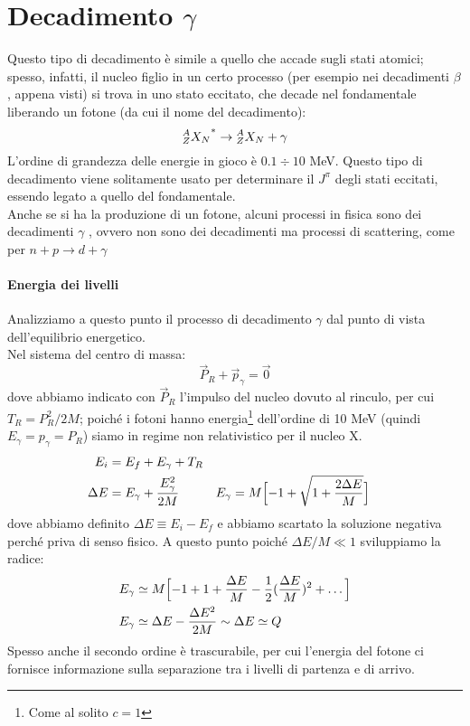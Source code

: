 \section{Decadimento $\gamma$}
Questo tipo di decadimento è simile a quello che accade sugli stati atomici; spesso, infatti, il nucleo figlio in un certo processo (per esempio nei decadimenti $\beta$, appena visti) si trova in uno stato eccitato, che decade nel fondamentale liberando un fotone (da cui il nome del decadimento):
$$\nuc{X}{A}{Z}{N}^* \to \nuc{X}{A}{Z}{N} + \gamma $$
L'ordine di grandezza delle energie in gioco è $0.1 \div 10$ MeV. Questo tipo di decadimento viene solitamente usato per determinare il $J^\pi$ degli stati eccitati, essendo legato a quello del fondamentale.\\
Anche se si ha la produzione di un fotone, alcuni processi in fisica sono dei decadimenti $\gamma$ , ovvero non sono dei decadimenti ma processi di scattering, come per $n+p\to d +\gamma$

\paragraph{Energia dei livelli} Analizziamo a questo punto il processo di decadimento $\gamma$ dal punto di vista dell'equilibrio energetico.\\
Nel sistema del centro di massa:
$$\vec{P}_R + \vec{p}_\gamma = \vec{0}$$
dove abbiamo indicato con $\vec{P}_R$ l'impulso del nucleo dovuto al rinculo, per cui $T_R = P_R^2/2M$; poiché i fotoni hanno energia\footnote{Come al solito $c=1$} dell'ordine di 10 MeV (quindi $E_\gamma=p_\gamma = P_R$) siamo in regime non relativistico per il nucleo X.
\begin{displaymath}
\begin{aligned}
E_i&=E_f + E_\gamma + T_R \\
\Delta E &= E_\gamma + \frac{E_\gamma^2}{2M} &
E_\gamma &= M\Bigl [ -1 + \sqrt{1+\frac{2\Delta E}{M}} \Bigr]
\end{aligned}
\end{displaymath}
dove abbiamo definito %
$\Delta E \equiv E_i-E_f$ e abbiamo scartato la soluzione negativa perché priva di senso fisico. A questo punto poiché $\Delta E /M \ll 1$ sviluppiamo la radice:
\begin{displaymath}
\begin{aligned}
E_\gamma &\simeq M\Bigl [ -1 + 1+ \frac{\Delta E}{M} -\frac{1}{2}(\frac{\Delta E}{M})^2 + \dots \Bigr] \\
E_\gamma &\simeq \Delta E - \frac{\Delta E^2}{2M} \sim \Delta E \simeq Q
\end{aligned}
\end{displaymath}
Spesso anche il secondo ordine è trascurabile, per cui l'energia del fotone ci fornisce informazione sulla separazione tra i livelli di partenza e di arrivo.

